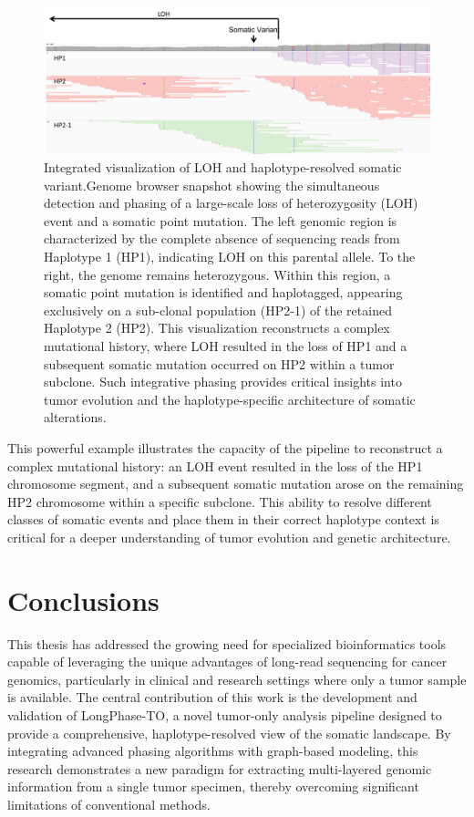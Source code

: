 \documentclass[pdflatex,sn-nature]{sn-jnl}
\def\pandocbounded#1{%
  \begingroup
  \setkeys{Gin}{width=1.0\linewidth,height=1.0\textheight,keepaspectratio}%
  #1%
  \endgroup
}
\begin{document}
\begin{figure}
\centering
\pandocbounded{\includegraphics[keepaspectratio]{page_35_cropped.jpg}}
\caption[Integrated visualization of LOH and haplotype-resolved somatic variant]{Integrated visualization of LOH and haplotype-resolved somatic variant.Genome browser snapshot showing the simultaneous detection and phasing of a large-scale loss of heterozygosity (LOH) event and a somatic point mutation. The left genomic region is characterized by the complete absence of sequencing reads from Haplotype 1 (HP1), indicating LOH on this parental allele. To the right, the genome remains heterozygous. Within this region, a somatic point mutation is identified and haplotagged, appearing exclusively on a sub-clonal population (HP2-1) of the retained Haplotype 2 (HP2). This visualization reconstructs a complex mutational history, where LOH resulted in the loss of HP1 and a subsequent somatic mutation occurred on HP2 within a tumor subclone. Such integrative phasing provides critical insights into tumor evolution and the haplotype-specific architecture of somatic alterations.}
\label{fig:met-page-35-cropped-jpg}
\end{figure}

This powerful example illustrates the capacity of the pipeline to reconstruct a complex mutational history: an LOH event resulted in the loss of the HP1 chromosome segment, and a subsequent somatic mutation arose on the remaining HP2 chromosome within a specific subclone. This ability to resolve different classes of somatic events and place them in their correct haplotype context is critical for a deeper understanding of tumor evolution and genetic architecture.


\section{Conclusions}\label{conclusions}

This thesis has addressed the growing need for specialized bioinformatics tools capable of leveraging the unique advantages of long-read sequencing for cancer genomics, particularly in clinical and research settings where only a tumor sample is available. The central contribution of this work is the development and validation of LongPhase-TO, a novel tumor-only analysis pipeline designed to provide a comprehensive, haplotype-resolved view of the somatic landscape. By integrating advanced phasing algorithms with graph-based modeling, this research demonstrates a new paradigm for extracting multi-layered genomic information from a single tumor specimen, thereby overcoming significant limitations of conventional methods.
\end{document}

